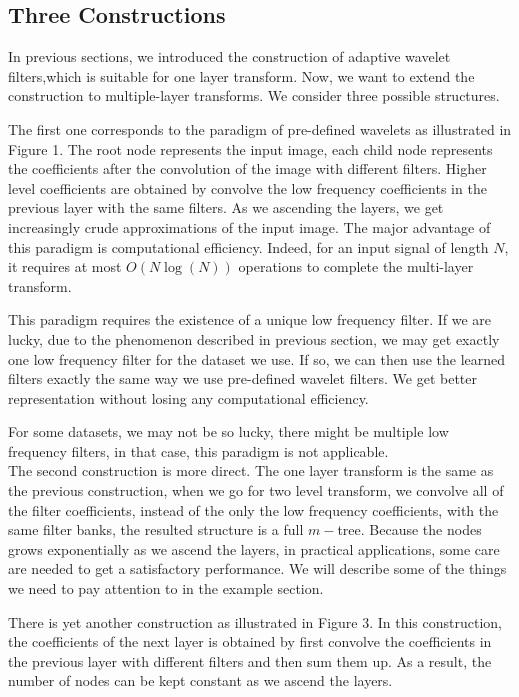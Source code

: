 \documentclass[a4paper]{article}
\begin{document}
\subsection{Three Constructions}
In previous sections, we introduced the construction of adaptive wavelet filters,which is suitable for one layer transform. Now, we want to extend the construction to multiple-layer transforms. We consider three possible structures.

The first one corresponds to the paradigm of pre-defined wavelets as illustrated in Figure 1. The root node represents the input image, each child node represents the coefficients after the convolution of the image with different filters. Higher level coefficients are obtained by convolve the low frequency coefficients in the previous layer with the same filters. As we ascending the layers, we get increasingly crude approximations of the input image. The major advantage of this paradigm is computational efficiency. Indeed, for an input signal of length $N$, it requires at most $O(N\log(N))$ operations to complete the multi-layer transform. 

This paradigm requires the existence of a unique low frequency filter. If we are lucky, due to the phenomenon described in previous section, we may get exactly one low frequency filter for the dataset we use. If so, we can then use the learned filters exactly the same way we use pre-defined wavelet filters. We get better representation without losing any computational efficiency.

For some datasets, we may not be so lucky, there might be multiple low frequency filters, in that case, this paradigm is not applicable.\\

The second construction is more direct. The one layer transform is the same as the previous construction, when we go for two level transform, we convolve all of the filter coefficients, instead of the only the low frequency coefficients, with the same filter banks, the resulted structure is a full $m-$tree. Because the nodes grows exponentially as we ascend the layers, in practical applications, some care are needed to get a satisfactory performance. We will describe some of the things we need to pay attention to in the example section.

There is yet another construction as illustrated in Figure 3. In this construction, the coefficients of the next layer is obtained by first convolve the coefficients in the previous layer with different filters and then sum them up. As a result, the number of nodes can be kept constant as we ascend the layers.
\end{document}
